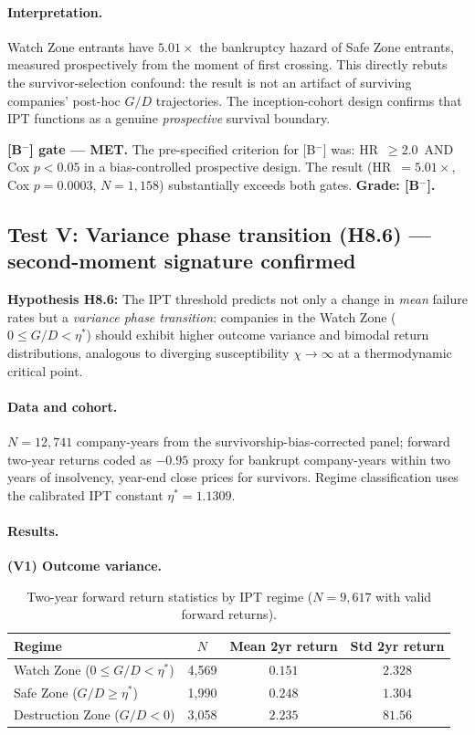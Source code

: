 \documentclass[11pt]{article}
\theoremstyle{remark}
\begin{document}
\paragraph{Interpretation.}
Watch Zone entrants have $5.01\times$ the bankruptcy hazard of Safe Zone entrants,
measured prospectively from the moment of first crossing.
This directly rebuts the survivor-selection confound: the result is not an artifact of
surviving companies' post-hoc $G/D$ trajectories.
The inception-cohort design confirms that IPT functions as a genuine \emph{prospective}
survival boundary.

\medskip
\textbf{[B$^-$] gate --- MET.}
The pre-specified criterion for [B$^-$] was: HR~$\geq 2.0$~AND Cox $p < 0.05$ in a
bias-controlled prospective design. The result (HR~$= 5.01\times$, Cox $p = 0.0003$,
$N = 1{,}158$) substantially exceeds both gates.
\textbf{Grade: [B$^-$].}

\subsection{Test V: Variance phase transition (H8.6) --- second-moment signature confirmed}
\label{sec:org:variance}

\textbf{Hypothesis H8.6:} The IPT threshold predicts not only a change in \emph{mean} failure rates
but a \emph{variance phase transition}: companies in the Watch Zone ($0 \le G/D < \eta^*$)
should exhibit higher outcome variance and bimodal return distributions, analogous to diverging
susceptibility $\chi \to \infty$ at a thermodynamic critical point.

\paragraph{Data and cohort.}
$N = 12{,}741$ company-years from the survivorship-bias-corrected panel;
forward two-year returns coded as $-0.95$ proxy for bankrupt company-years within two years of
insolvency, year-end close prices for survivors.
Regime classification uses the calibrated IPT constant $\eta^* = 1.1309$.

\paragraph{Results.}

\textbf{(V1) Outcome variance.}
\begin{table}[H]
\centering
\caption{Two-year forward return statistics by IPT regime ($N = 9{,}617$ with valid forward returns).}
\label{tab:variance_by_regime}
\begin{tabular}{@{}lccc@{}}
\toprule
Regime & $N$ & Mean 2yr return & Std 2yr return \\
\midrule
Watch Zone ($0 \le G/D < \eta^*$) & 4{,}569 & $0.151$ & $2.328$ \\
Safe Zone ($G/D \ge \eta^*$) & 1{,}990 & $0.248$ & $1.304$ \\
Destruction Zone ($G/D < 0$) & 3{,}058 & $2.235$ & $81.56$ \\
\bottomrule
\end{tabular}
\end{table}
\end{document}
